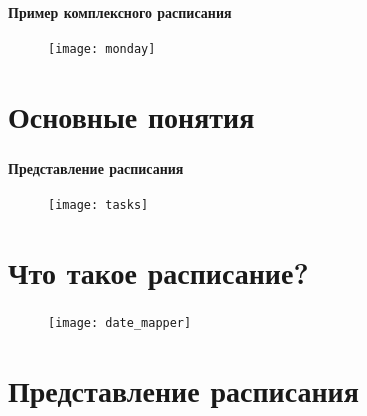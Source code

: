 \begin{frame}
\frametitle{\insertsection}
\framesubtitle{Пример комплексного расписания}

\begin{figure}
    \center
    \texttt{[image: monday]}
\end{figure}
\end{frame}


\section{Основные понятия}

\begin{frame}
\frametitle{\insertsection}
\framesubtitle{Представление расписания}

\begin{figure}
    \center
    \texttt{[image: tasks]}
\end{figure}
\end{frame}


\section{Что такое расписание?}

\begin{frame}
\frametitle{\insertsection}

\begin{figure}
    \center
    \texttt{[image: date\_mapper]}
\end{figure}
\end{frame}


\section{Представление расписания}

